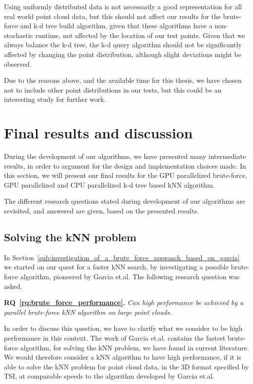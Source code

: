 Using uniformly distributed data is not necessarily a good representation for all real world point cloud data, but this should not affect our results for the brute-force and k-d tree build algorithm, given that these algorithms have a non-stochastic runtime, not affected by the location of our test points. Given that we always balance the k-d tree, the k-d query algorithm should not be significantly affected by changing the point distribution, although slight deviations might be observed.

Due to the reasons above, and the available time for this thesis, we have chosen not to include other point distributions in our tests, but this could be an interesting study for further work.

\section{Final results and discussion} %
\label{sec:final_results_and_discusstion}

During the development of our algorithms, we have presented many intermediate results, in order to argument for the design and implementation choices made. In this section, we will present our final results for the GPU parallelized brute-force, GPU parallelized and CPU parallelized k-d tree based kNN algorithm.

The different research questions stated during development of our algorithms are revisited, and answered are given, based on the presented results.

\subsection{Solving the kNN problem} %
\label{sub:solving_the_knn_problem}

In Section~\ref{sub:investigation_of_a_brute_force_approach_based_on_garcia} we started on our quest for a faster kNN search, by investigating a possible brute-force algorithm, pioneered by Garcia et.al. The following research question was asked. 

\textbf{RQ~\ref{rq:brute_force_performance}.} \emph{Can high performance be achieved by a parallel brute-force kNN algorithm on large point clouds.}

In order to discuss this question, we have to clarify what we consider to be high performance in this context. The work of Garcia et.al\@. contains the fastest brute-force algorithm, for solving the kNN problem, we have found in current literature. We would therefore consider a kNN algorithm to have high performance, if it is able to solve the kNN problem for point cloud data, in the 3D format specified by TSI, at comparable speeds to the algorithm developed by Garcia et.al. 

